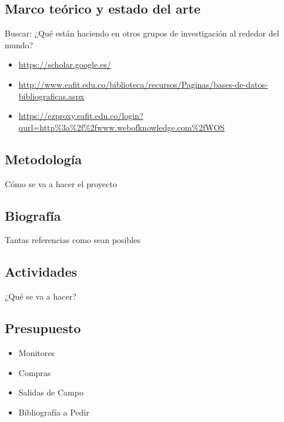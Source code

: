\subsection{Marco teórico y estado del arte}
	Buscar: ¿Qué están haciendo en otros grupos de investigación al rededor del mundo?
	\begin{itemize}
		\item \url{https://scholar.google.es/}
		\item \url{http://www.eafit.edu.co/biblioteca/recursos/Paginas/bases-de-datos-bibliograficas.aspx}
		\item \url{https://ezproxy.eafit.edu.co/login?qurl=http%3a%2f%2fwww.webofknowledge.com%2fWOS}
	\end{itemize}


\subsection{Metodología}
	Cómo se va a hacer el proyecto

\subsection{Biografía}
	Tantas referencias como sean posibles

\subsection{Actividades}
	¿Qué se va a hacer?

\subsection{Presupuesto}
	\begin{itemize}
		\item Monitores
		\item Compras
		\item Salidas de Campo
		\item Bibliografía a Pedir
	\end{itemize}
